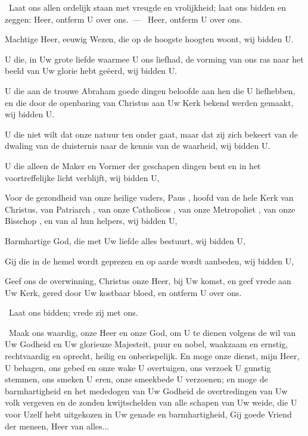 \documentclass[12pt,twoside,a5paper]{article}
\begin{document}


\begin{halfparskip}
  \dd~Laat ons allen ordelijk staan met vreugde en vrolijkheid; laat ons bidden en zeggen: Heer, ontferm U over ons.~--- \rr~Heer, ontferm U over ons. 

  Machtige Heer, eeuwig Wezen, die op de hoogste hoogten woont, wij bidden U.

  U die, in Uw grote liefde waarmee U ons liefhad, de vorming van ons ras naar het beeld van Uw glorie hebt geëerd, wij bidden U.

  U die aan de trouwe Abraham goede dingen beloofde aan hen die U liefhebben, en die door de openbaring van Christus aan Uw Kerk bekend werden gemaakt, wij bidden U.

  U die niet wilt dat onze natuur ten onder gaat, maar dat zij zich bekeert van de dwaling van de duisternis naar de kennis van de waarheid, wij bidden U.

  U die alleen de Maker en Vormer der geschapen dingen bent en in het voortreffelijke licht verblijft, wij bidden U,

  Voor de gezondheid van onze heilige vaders, Paus \NN , hoofd van de hele Kerk van Christus, van Patriarch \NN , van onze Catholicos \NN , van onze Metropoliet \NN , van onze Bisschop \NN , en van al hun helpers, wij bidden U,

  Barmhartige God, die met Uw liefde alles bestuurt, wij bidden U,

  Gij die in de hemel wordt geprezen en op aarde wordt aanbeden, wij bidden U,

  Geef ons de overwinning, Christus onze Heer, bij Uw komst, en geef vrede aan Uw Kerk, gered door Uw kostbaar bloed, en ontferm U over ons.
\end{halfparskip}

\begin{halfparskip}
   \dd~Laat ons bidden; vrede zij met ons.

  \cc~Maak ons waardig, onze Heer en onze God, om U te dienen volgens de wil van Uw Godheid en Uw glorieuze Majesteit, puur en nobel, waakzaam en ernstig, rechtvaardig en oprecht, heilig en onberispelijk. En moge onze dienst, mijn Heer, U behagen, ons gebed en onze wake U overtuigen, ons verzoek U gunstig stemmen, ons smeken U eren, onze smeekbede U verzoenen; en moge de barmhartigheid en het mededogen van Uw Godheid de overtredingen van Uw volk vergeven en de zonden kwijtschelden van alle schapen van Uw weide, die U voor Uzelf hebt uitgekozen in Uw genade en barmhartigheid, Gij goede Vriend der mensen, Heer van alles...
\end{halfparskip}

\end{document}
